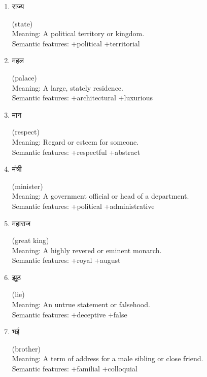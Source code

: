 \documentclass{article}
\begin{document}
\begin{enumerate}
\item \begin{hindi} राज्य \end{hindi} (state) \\
Meaning: A political territory or kingdom. \\
Semantic features: +political +territorial

\item \begin{hindi} महल \end{hindi} (palace) \\
Meaning: A large, stately residence. \\
Semantic features: +architectural +luxurious

\item \begin{hindi} मान \end{hindi} (respect) \\
Meaning: Regard or esteem for someone. \\
Semantic features: +respectful +abstract

\item \begin{hindi} मंत्री \end{hindi} (minister) \\
Meaning: A government official or head of a department. \\
Semantic features: +political +administrative

\item \begin{hindi} महाराज \end{hindi} (great king) \\
Meaning: A highly revered or eminent monarch. \\
Semantic features: +royal +august

\item \begin{hindi} झूठ \end{hindi} (lie) \\
Meaning: An untrue statement or falsehood. \\
Semantic features: +deceptive +false

\item \begin{hindi} भई \end{hindi} (brother) \\
Meaning: A term of address for a male sibling or close friend. \\
Semantic features: +familial +colloquial


\end{enumerate}
\end{document}
